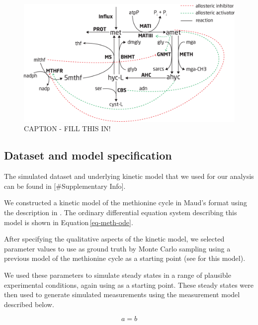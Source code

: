 \documentclass[journal=,manuscript=]{achemso}
\begin{document}
\begin{figure}

{\centering \includegraphics{./figures/methionine-reactions.png}

}

\caption{\label{fig-methionine-reactions}CAPTION - FILL THIS IN!}

\end{figure}

\hypertarget{dataset-and-model-specification}{%
\subsection{Dataset and model
specification}\label{dataset-and-model-specification}}

The simulated dataset and underlying kinetic model that we used for our
analysis can be found in {[}\#Supplementary Info{]}.

We constructed a kinetic model of the methionine cycle in Maud's format
using the description in \citet{korendyaseva_allosteric_2008}. The
ordinary differential equation system describing this model is shown in
Equation\,\eqref{eq-meth-ode}.

After specifying the qualitative aspects of the kinetic model, we
selected parameter values to use as ground truth by Monte Carlo sampling
using a previous model of the methionine cycle as a starting point (see
\citet{saa_general_2015} for this model).

We used these parameters to simulate steady states in a range of
plausible experimental conditions, again using \citet{saa_general_2015}
as a starting point. These steady states were then used to generate
simulated measurements using the measurement model described below.

\begin{equation}
a = b \label{eq-meth-ode}
\end{equation}
\end{document}
